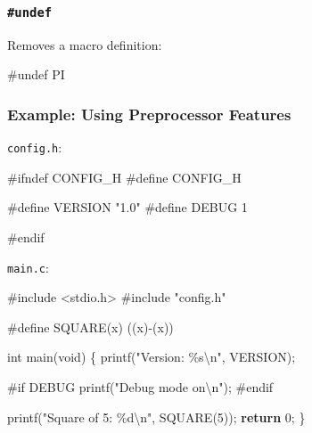 \documentclass[
  letterpaper,
  DIV=11,
  numbers=noendperiod]{scrreprt}
\newenvironment{Shaded}{\begin{snugshade}}{\end{snugshade}}
\newcommand{\ControlFlowTok}[1]{\textcolor[rgb]{0.00,0.23,0.31}{\textbf{#1}}}
\newcommand{\DataTypeTok}[1]{\textcolor[rgb]{0.68,0.00,0.00}{#1}}
\newcommand{\DecValTok}[1]{\textcolor[rgb]{0.68,0.00,0.00}{#1}}
\newcommand{\ImportTok}[1]{\textcolor[rgb]{0.00,0.46,0.62}{#1}}
\newcommand{\NormalTok}[1]{\textcolor[rgb]{0.00,0.23,0.31}{#1}}
\newcommand{\OperatorTok}[1]{\textcolor[rgb]{0.37,0.37,0.37}{#1}}
\newcommand{\PreprocessorTok}[1]{\textcolor[rgb]{0.68,0.00,0.00}{#1}}
\newcommand{\SpecialCharTok}[1]{\textcolor[rgb]{0.37,0.37,0.37}{#1}}
\newcommand{\StringTok}[1]{\textcolor[rgb]{0.13,0.47,0.30}{#1}}
\begin{document}
\subsubsection{\texorpdfstring{\texttt{\#undef}}{\#undef}}\label{undef}

Removes a macro definition:

\begin{Shaded}
\begin{Highlighting}[]
\PreprocessorTok{\#undef PI}
\end{Highlighting}
\end{Shaded}

\subsubsection{Example: Using Preprocessor
Features}\label{example-using-preprocessor-features}

\texttt{config.h}:

\begin{Shaded}
\begin{Highlighting}[]
\PreprocessorTok{\#ifndef CONFIG\_H}
\PreprocessorTok{\#define CONFIG\_H}

\PreprocessorTok{\#define VERSION }\StringTok{"1.0"}
\PreprocessorTok{\#define DEBUG }\DecValTok{1}

\PreprocessorTok{\#endif}
\end{Highlighting}
\end{Shaded}

\texttt{main.c}:

\begin{Shaded}
\begin{Highlighting}[]
\PreprocessorTok{\#include }\ImportTok{\textless{}stdio.h\textgreater{}}
\PreprocessorTok{\#include }\ImportTok{"config.h"}

\PreprocessorTok{\#define SQUARE}\OperatorTok{(}\PreprocessorTok{x}\OperatorTok{)}\PreprocessorTok{ }\OperatorTok{((}\PreprocessorTok{x}\OperatorTok{){-}(}\PreprocessorTok{x}\OperatorTok{))}

\DataTypeTok{int}\NormalTok{ main}\OperatorTok{(}\DataTypeTok{void}\OperatorTok{)} \OperatorTok{\{}
\NormalTok{    printf}\OperatorTok{(}\StringTok{"Version: }\SpecialCharTok{\%s\textbackslash{}n}\StringTok{"}\OperatorTok{,}\NormalTok{ VERSION}\OperatorTok{);}

\PreprocessorTok{\#if DEBUG}
\NormalTok{    printf}\OperatorTok{(}\StringTok{"Debug mode on}\SpecialCharTok{\textbackslash{}n}\StringTok{"}\OperatorTok{);}
\PreprocessorTok{\#endif}

\NormalTok{    printf}\OperatorTok{(}\StringTok{"Square of 5: }\SpecialCharTok{\%d\textbackslash{}n}\StringTok{"}\OperatorTok{,}\NormalTok{ SQUARE}\OperatorTok{(}\DecValTok{5}\OperatorTok{));}
    \ControlFlowTok{return} \DecValTok{0}\OperatorTok{;}
\OperatorTok{\}}
\end{Highlighting}
\end{Shaded}
\end{document}
